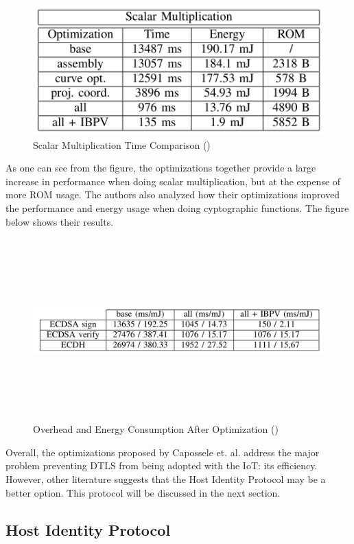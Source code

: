 \documentclass[letterpaper, 12pt]{article}
\begin{document}
\begin{flushleft}
\begin{figure}[H]
	\includegraphics[width=\linewidth,height=5cm,keepaspectratio]{figure6.png}
	\caption{Scalar Multiplication Time Comparison (\cite{Capossele})}
	\label{fig:arch}
\end{figure}

As one can see from the figure, the optimizations together provide a large increase in performance when doing scalar multiplication, but at the expense of more ROM usage. 
The authors also analyzed how their optimizations improved the performance and energy usage when doing cyptographic functions. The figure below
shows their results. 

\begin{figure}[H]
	\includegraphics[width=\linewidth,height=7cm,keepaspectratio]{figure5.png}
	\caption{Overhead and Energy Consumption After Optimization (\cite{Capossele})}
	\label{fig:arch}
\end{figure}

Overall, the optimizations proposed by Capossele et. al. address the major problem preventing DTLS from being adopted with the IoT: its efficiency.
However, other literature suggests that the Host Identity Protocol may be a better option. This protocol will be discussed in the next section.

\subsection*{Host Identity Protocol}


\end{flushleft}
\end{document}
